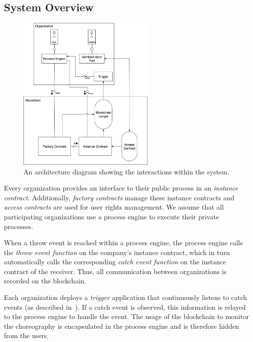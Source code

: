 \documentclass[runningheads]{llncs}
\begin{document}
\subsection{System Overview}
\begin{figure}
	\centering
	\includegraphics[width=0.6\textwidth]{fig/system_diagram.eps}
	\caption{An architecture diagram showing the interactions within the system.}
	\label{fig:system_diagram}
\end{figure}

Every organization provides an interface to their public process in an \emph{instance contract}.
Additionally, \emph{factory contracts} manage these instance contracts and \emph{access contracts} are used for user rights management.
We assume that all participating organizations use a process engine to execute their private processes.

When a throw event is reached within a process engine, the process engine calls the \emph{throw event function} on the company's instance contract, which in turn automatically calls the corresponding \emph{catch event function} on the instance contract of the receiver.
Thus, all communication between organizations is recorded on the blockchain.

Each organization deploys a \emph{trigger} application that continuously listens to catch events (as described in~\cite{weber2016untrusted}).
If a catch event is observed, this information is relayed to the process engine to handle the event.
The usage of the blockchain to monitor the choreography is encapsulated in the process engine and is therefore hidden from the users.
\end{document}
